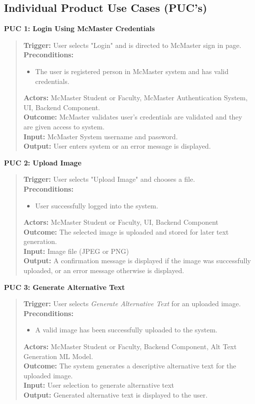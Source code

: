 \documentclass[12pt]{article}
\begin{document}
\subsection{Individual Product Use Cases (PUC's)}
\textbf{PUC 1: Login Using McMaster Credentials }
\begin{quote}
  \textbf{Trigger:} User selects "Login" and is directed to McMaster
  sign in page.\\
  \textbf{Preconditions:}
  \begin{itemize}
    \item The user is registered person in McMaster system and has
      valid credentials.
  \end{itemize}
  \textbf{Actors:} McMaster Student or Faculty, McMaster Authentication System, UI, Backend Component.\\
  \textbf{Outcome:} McMaster validates user's credentials are
  validated and they are given access to system.\\
  \textbf{Input:} McMaster System username and password. \\
  \textbf{Output:} User enters system or an error message is displayed.
\end{quote}
\textbf{PUC 2: Upload Image }
\begin{quote}
\textbf{Trigger:} User selects "Upload Image" and chooses a file.\\
\textbf{Preconditions:}
\begin{itemize}
  \item User successfully logged into the system.
\end{itemize}
\textbf{Actors:} McMaster Student or Faculty, UI, Backend Component\. \\
\textbf{Outcome:} The selected image is uploaded and stored for later text generation.\\
\textbf{Input:} Image file (JPEG or PNG) \\
\textbf{Output:} A confirmation message is displayed if the image was successfully uploaded, or an error message otherwise is displayed.
\end{quote}
\textbf{PUC 3: Generate Alternative Text}
\begin{quote}
  \textbf{Trigger:} User selects \textit{Generate Alternative Text}
  for an uploaded image.\\
  \textbf{Preconditions:}
  \begin{itemize}
    \item A valid image has been successfully uploaded to the system.
  \end{itemize}
  \textbf{Actors:} McMaster Student or Faculty, Backend Component, Alt Text Generation ML Model. \\
  \textbf{Outcome:} The system generates a descriptive alternative
  text for the uploaded image.\\
  \textbf{Input:} User selection to generate alternative text\\
  \textbf{Output:} Generated alternative text is displayed to the user.
\end{quote}
\end{document}
